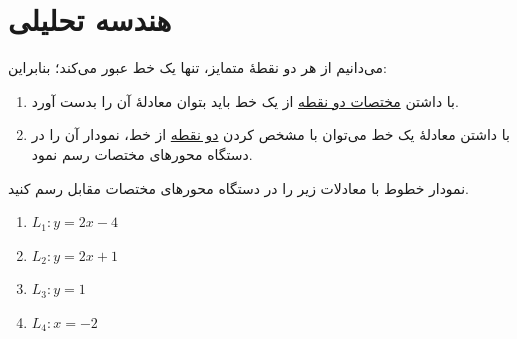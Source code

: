 \chapter{هندسه تحلیلی}

می‌دانیم از هر دو نقطۀ متمایز، تنها یک خط عبور می‌کند؛ بنابراین:
\begin{enumerate}
    \item با داشتن \underline{مختصات دو نقطه} از یک خط باید بتوان معادلۀ آن را بدست آورد.
    \item با داشتن معادلۀ یک خط می‌توان با مشخص کردن \underline{دو نقطه} از خط، نمودار آن را در دستگاه محورهای مختصات رسم نمود.
\end{enumerate}

\begin{example}
نمودار خطوط با معادلات زیر را در دستگاه محورهای مختصات مقابل رسم کنید.
\end{example}

\begin{LTR}
\begin{minipage}[c]{0.35\textwidth}
\vspace{0pt}
\begin{enumerate}
\setlength{\itemsep}{0.7cm}
\item $L_1:y=2x-4$
\item $L_2:y=2x+1$
\item $L_3:y=1$
\item $L_4:x=-2$
\end{enumerate}
\end{minipage}\hfill\begin{minipage}[c]{0.55\textwidth}
    \vspace{0pt}
    \centering

\end{minipage}
\end{LTR}

